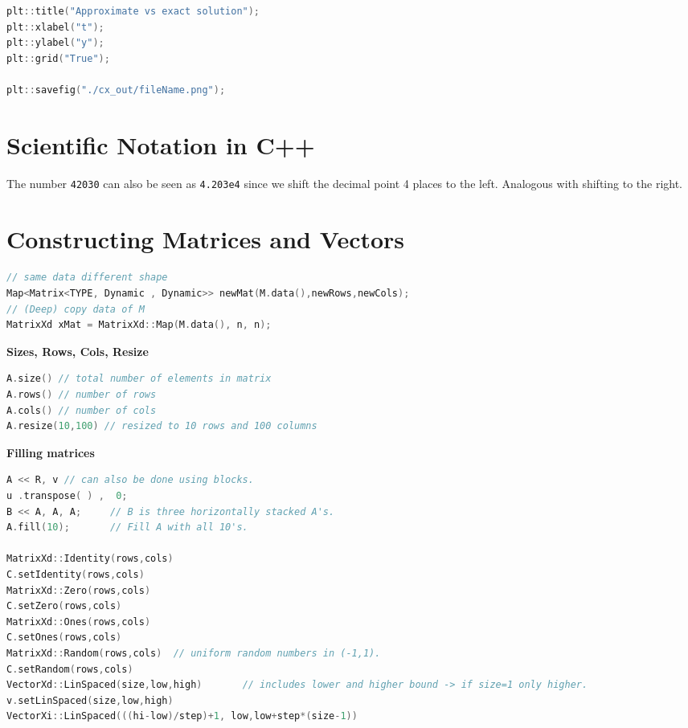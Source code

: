 \documentclass{sciposter}
\newcommand{\psection}[1]{\par \textbf{\large#1}}
\begin{document}
\begin{multicols}{2}
\begin{lstlisting}[language=c++]
plt::title("Approximate vs exact solution");
plt::xlabel("t");
plt::ylabel("y");
plt::grid("True");

plt::savefig("./cx_out/fileName.png");
\end{lstlisting}


\section*{Scientific Notation in C++}

The number \texttt{42030} can also be seen as \texttt{4.203e4} since we shift the decimal point 4 places to the left. Analogous with shifting to the right.
	
\section*{Constructing Matrices and Vectors}
\begin{lstlisting}[language=C++]
// same data different shape
Map<Matrix<TYPE, Dynamic , Dynamic>> newMat(M.data(),newRows,newCols);
// (Deep) copy data of M
MatrixXd xMat = MatrixXd::Map(M.data(), n, n);
\end{lstlisting}


\psection{Sizes, Rows, Cols, Resize}
\begin{lstlisting}[language=C++]
A.size() // total number of elements in matrix
A.rows() // number of rows
A.cols() // number of cols
A.resize(10,100) // resized to 10 rows and 100 columns
\end{lstlisting}


\psection{Filling matrices}
\begin{lstlisting}[language=C++]
A << R,	v // can also be done using blocks. 
u .transpose( ) ,  0;
B << A, A, A;     // B is three horizontally stacked A's.
A.fill(10);       // Fill A with all 10's.

MatrixXd::Identity(rows,cols)          
C.setIdentity(rows,cols)                 
MatrixXd::Zero(rows,cols)                
C.setZero(rows,cols)                      
MatrixXd::Ones(rows,cols)          
C.setOnes(rows,cols)                 
MatrixXd::Random(rows,cols)  // uniform random numbers in (-1,1).
C.setRandom(rows,cols)                 
VectorXd::LinSpaced(size,low,high)       // includes lower and higher bound -> if size=1 only higher. 
v.setLinSpaced(size,low,high)         
VectorXi::LinSpaced(((hi-low)/step)+1, low,low+step*(size-1))
\end{lstlisting}




\end{multicols}
\end{document}
